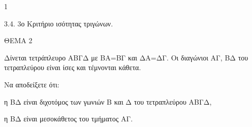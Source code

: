 \begin{ylh}{1}
    \item 3.4. 3ο Κριτήριο ισότητας τριγώνων.
\end{ylh}

ΘΕΜΑ 2

Δίνεται τετράπλευρο ΑΒΓΔ με ΒA=ΒΓ και ΔA=ΔΓ. Οι διαγώνιοι ΑΓ, ΒΔ του τετραπλεύρου είναι ίσες και τέμνονται κάθετα.

Να αποδείξετε ότι:

\begin{alist}
\item η ΒΔ είναι διχοτόμος των γωνιών Β και Δ του τετραπλεύρου ΑΒΓΔ, 

\item η ΒΔ είναι μεσοκάθετος του τμήματος ΑΓ. 


\begin{center}
\end{center}
\end{alist}
